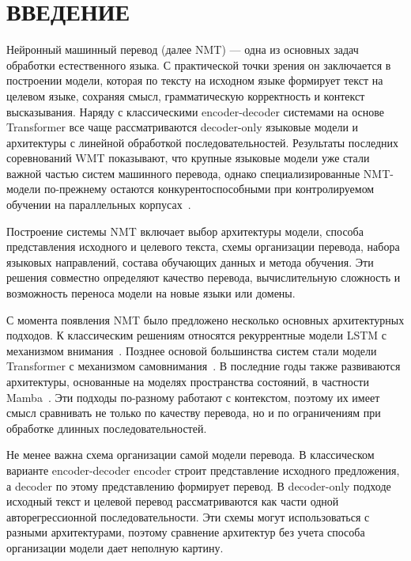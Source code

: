 \section*{ВВЕДЕНИЕ}

Нейронный машинный перевод (далее NMT) --- одна из основных задач обработки естественного языка.
С практической точки зрения он заключается в построении модели, которая по тексту на исходном языке формирует текст на целевом языке, сохраняя смысл, грамматическую корректность и контекст высказывания.
Наряду с классическими encoder-decoder системами на основе Transformer все чаще рассматриваются decoder-only языковые модели и архитектуры с линейной обработкой последовательностей.
Результаты последних соревнований WMT показывают, что крупные языковые модели уже стали важной частью систем машинного перевода, однако специализированные NMT-модели по-прежнему остаются конкурентоспособными при контролируемом обучении на параллельных корпусах~\cite{wmt24_general}.

Построение системы NMT включает выбор архитектуры модели, способа представления исходного и целевого текста, схемы организации перевода, набора языковых направлений, состава обучающих данных и метода обучения.
Эти решения совместно определяют качество перевода, вычислительную сложность и возможность переноса модели на новые языки или домены.

С момента появления NMT было предложено несколько основных архитектурных подходов.
К классическим решениям относятся рекуррентные модели LSTM с механизмом внимания~\cite{luong}.
Позднее основой большинства систем стали модели Transformer с механизмом самовнимания~\cite{transformer}.
В последние годы также развиваются архитектуры, основанные на моделях пространства состояний, в частности Mamba~\cite{mamba}.
Эти подходы по-разному работают с контекстом, поэтому их имеет смысл сравнивать не только по качеству перевода, но и по ограничениям при обработке длинных последовательностей.

Не менее важна схема организации самой модели перевода.
В классическом варианте encoder-decoder encoder строит представление исходного предложения, а decoder по этому представлению формирует перевод.
В decoder-only подходе исходный текст и целевой перевод рассматриваются как части одной авторегрессионной последовательности.
Эти схемы могут использоваться с разными архитектурами, поэтому сравнение архитектур без учета способа организации модели дает неполную картину.

